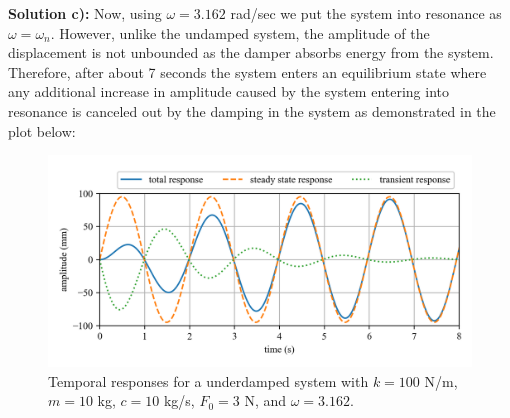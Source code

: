\documentclass[12pt,letter]{article}
\begin{document}
\begin{example}
		\noindent\textbf{Solution c):} Now, using $\omega=3.162$ rad/sec we put the system into resonance as $\omega=\omega_n$. However, unlike the undamped system, the amplitude of the displacement is not unbounded as the damper absorbs energy from the system. Therefore, after about 7 seconds the system enters an equilibrium state where any additional increase in amplitude caused by the system entering into resonance is canceled out by the damping in the system as demonstrated in the plot below:
		\begin{figure}[H]
			\centering
			\includegraphics[]{../figures/homogeneous_and_particular_solutions_in_resonance_c.png}
			\caption{Temporal responses for a underdamped system with $k=100$ N/m, $m=10$ kg,  $c=10$ kg/s, $F_0=3$ N, and $\omega = 3.162$.}
		\end{figure}				
	\end{example}	
\end{document}
